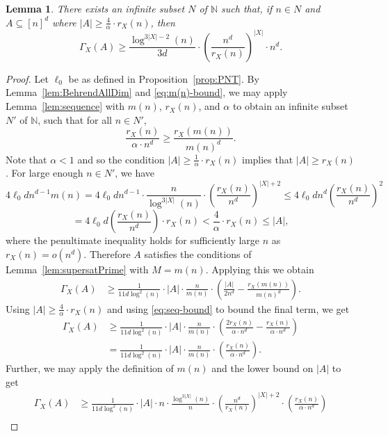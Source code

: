 \documentclass[12pt]{article}
\numberwithin{equation}{section}
\newtheorem{lem}[equation]{Lemma}
\theoremstyle{definition}
\theoremstyle{remark}
\begin{document}
\begin{lem}\label{lem:supersat-seq}
There exists an infinite subset $N$ of $\mathbb{N}$ such that, if $n\in N$ and $A\subseteq [n]^d$ where $|A|\geq \frac{4}{\alpha}\cdot r_X(n)$, then 
\[\Gamma_X(A) \geq \frac{\log^{3|X|-2}(n)}{3d}\cdot\left(\frac{n^d}{r_X(n)}\right)^{|X|}\cdot n^d.\]
\end{lem}

\begin{proof}

Let $\ell_0$ be as defined in Proposition~\ref{prop:PNT}. By Lemma~\ref{lem:BehrendAllDim} and \eqref{eq:m(n)-bound}, we may apply Lemma~\ref{lem:sequence} with $m(n)$, $r_X(n)$, and $\alpha$ to obtain an infinite subset $N'$ of $\mathbb{N}$, such that for all $n \in N'$,
\begin{equation}\label{eq:seq-bound}
\frac{r_X(n)}{\alpha\cdot n^d} \geq\frac{r_X(m(n))}{m(n)^d}. 
\end{equation}
Note that $\alpha<1$ and so the condition $|A|\geq \frac{1}{\alpha}\cdot r_X(n)$ implies that $|A|\geq r_X(n)$. For large enough $n\in N'$, we have
\[4\ell_0dn^{d-1}m(n) = 4\ell_0dn^{d-1}\cdot\frac{n}{\log^{3|X|}(n)}\cdot\left(\frac{r_X(n)}{n^d}\right)^{|X|+2} 
\leq 4\ell_0dn^{d}\left(\frac{r_X(n)}{n^d}\right)^2\]
\[= 4\ell_0d\left(\frac{r_X(n)}{n^d}\right)\cdot r_X(n)
< \frac{4}{\alpha}\cdot r_X(n)\leq |A|,
\]
where the penultimate inequality holds for sufficiently large $n$ as $r_X(n) = o(n^d)$.
Therefore $A$ satisfies the conditions of Lemma~\ref{lem:supersatPrime} with $M=m(n)$. Applying this we obtain 
\begin{align*}
\Gamma_X(A) &\geq \frac{1}{11d\log^2(n)}\cdot |A| \cdot \frac{n}{m(n)}\cdot\left(\frac{|A|}{2n^d} - \frac{r_X(m(n))}{m(n)^d}\right). 
\end{align*}
Using $|A|\geq \frac{4}{\alpha}\cdot r_X(n)$ and using \eqref{eq:seq-bound} to bound the final term, we get
\begin{align*}
\Gamma_X(A) &\geq \frac{1}{11d\log^2(n)}\cdot |A| \cdot \frac{n}{m(n)}\cdot\left(\frac{2r_X(n)}{\alpha \cdot n^d} - \frac{r_X(n)}{\alpha\cdot n^d}\right) \\ 
&= \frac{1}{11d\log^2(n)}\cdot |A| \cdot \frac{n}{m(n)} \cdot\left(\frac{r_X(n)}{\alpha\cdot n^d}\right).
\end{align*}
Further, we may apply the definition of $m(n)$ and the lower bound on $|A|$ to get
\begin{align*}
\Gamma_X(A) &\geq \frac{1}{11d\log^2(n)}\cdot |A| \cdot n \cdot \frac{\log^{3|X|}(n)}{n}\cdot \left(\frac{n^d}{r_X(n)} \right)^{|X|+2}\cdot\left(\frac{r_X(n)}{\alpha\cdot n^d}\right) \\

\end{align*}
\end{proof}
\end{document}
